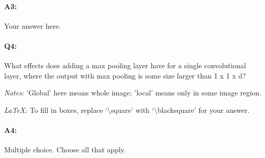 \paragraph{A3:} Your answer here.







\pagebreak
\paragraph{Q4:} What effects does adding a max pooling layer have for a single convolutional layer, where the output with max pooling is some size larger than 1 x 1 x d?

\emph{Notes:} 'Global' here means whole image; 'local' means only in some image region.

\emph{LaTeX:} To fill in boxes, replace `\textbackslash square' with `\textbackslash blacksquare' for your answer.

\paragraph{A4:} Multiple choice. Choose all that apply.

